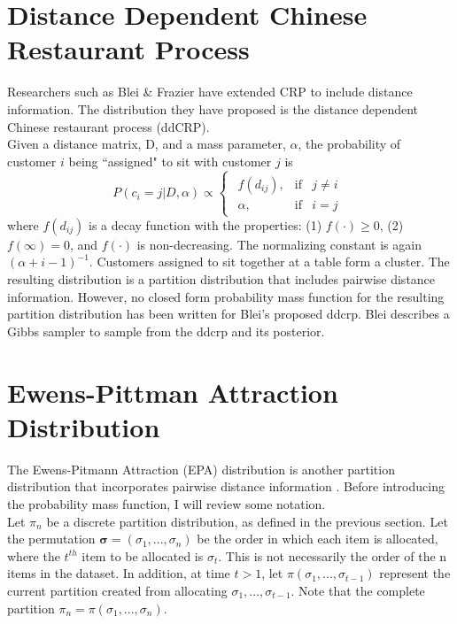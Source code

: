 

\section{Distance Dependent Chinese Restaurant Process}
Researchers such as Blei \& Frazier have extended CRP to include 
distance information. The distribution they have proposed is the distance
dependent Chinese restaurant process (ddCRP). \\

\noindent
Given a distance matrix, D, and a mass parameter, $\alpha$, the probability
of customer $i$ being ``assigned" to sit with customer $j$ is 
\begin{equation}
  P(c_i=j|D,\alpha) \propto 
  \begin{cases}
    \begin{array}{rll}
      f(d_{ij}), & \text{if} & j \ne i\\
      \alpha,    & \text{if} & i=j
    \end{array}  
  \end{cases}
\end{equation}
where $f(d_{ij})$ is a decay function with the properties: (1) $f(\cdot) \ge 0$,
(2) $f(\infty) = 0$, and $f(\cdot)$ is non-decreasing. The normalizing constant 
is again $(\alpha+i-1)^{-1}$. Customers assigned to sit together at a table
form a cluster. The resulting distribution is a partition distribution that
includes pairwise distance information. However, no closed form probability 
mass function for the resulting partition distribution has been written for 
Blei's proposed ddcrp. Blei describes a Gibbs sampler to sample from the 
ddcrp and its posterior.

\section{Ewens-Pittman Attraction Distribution}
The Ewens-Pitmann Attraction (EPA) distribution is another partition
distribution that incorporates pairwise distance information \cite{epa}.
Before introducing the probability mass function, I will review some
notation.\\

\noindent
Let $\pi_n$ be a discrete partition distribution, as defined in the previous
section. Let the permutation $\bm \sigma = (\sigma_1,...,\sigma_n)$ be the order
in which each item is allocated, where the $t^{th}$ item to be allocated is
$\sigma_t$. This is not necessarily the order of the n items in the dataset. In
addition, at time $t > 1$, let $\pi(\sigma_{1},...,\sigma_{t-1})$ represent the
current partition created from allocating $\sigma_{1},...,\sigma_{t-1}$. Note
that the complete partition $\pi_n = \pi(\sigma_{1},...,\sigma_{n})$.\\

